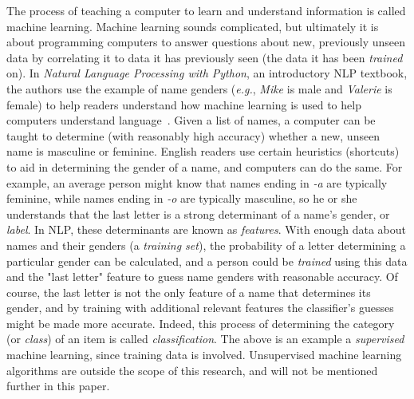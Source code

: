 The process of teaching a computer to learn and understand information is called machine learning.
Machine learning sounds complicated, but ultimately it is about programming computers to answer questions about new, previously unseen data by correlating it to data it has previously seen (the data it has been {\it trained} on).
In {\it Natural Language Processing with Python}, an introductory NLP textbook, the authors use the example of name genders ({\it e.g.}, {\it Mike} is male and {\it Valerie} is female) to help readers understand how machine learning is used to help computers understand language~\cite{nlpwp}.
Given a list of names, a computer can be taught to determine (with reasonably high accuracy) whether a new, unseen name is masculine or feminine.
English readers use certain heuristics (shortcuts) to aid in determining the gender of a name, and computers can do the same.
For example, an average person might know that names ending in {\it -a} are typically feminine, while names ending in {\it -o} are typically masculine, so he or she understands that the last letter is a strong determinant of a name's gender, or {\it label}.
In NLP, these determinants are known as {\it features}.
With enough data about names and their genders (a {\it training set}), the probability of a letter determining a particular gender can be calculated, and a person could be {\it trained} using this data and the "last letter" feature to guess name genders with reasonable accuracy.
Of course, the last letter is not the only feature of a name that determines its gender, and by training with additional relevant features the classifier's guesses might be made more accurate.
Indeed, this process of determining the category (or {\it class}) of an item is called {\it classification}.
The above is an example a {\it supervised} machine learning, since training data is involved.
Unsupervised machine learning algorithms are outside the scope of this research, and will not be mentioned further in this paper.

